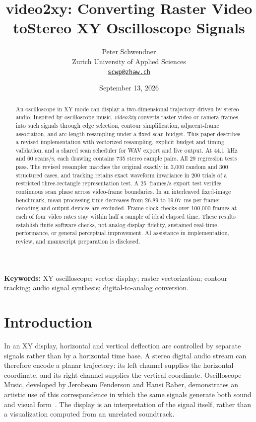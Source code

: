 \documentclass[11pt,a4paper]{article}
\title{\textbf{video2xy: Converting Raster Video to\newline Stereo XY Oscilloscope Signals}}
\author{Peter Schwendner\\[3pt]
\small Zurich University of Applied Sciences\\
\small\href{mailto:scwp@zhaw.ch}{\texttt{scwp@zhaw.ch}}}
\date{September 13, 2026}
\begin{document}
\maketitle
\begin{abstract}
An oscilloscope in XY mode can display a two-dimensional trajectory driven by stereo audio. Inspired by oscilloscope music, \emph{video2xy} converts raster video or camera frames into such signals through edge selection, contour simplification, adjacent-frame association, and arc-length resampling under a fixed scan budget. This paper describes a revised implementation with vectorized resampling, explicit budget and timing validation, and a shared scan scheduler for WAV export and live output. At 44.1~kHz and 60 scans/s, each drawing contains 735 stereo sample pairs. All 29 regression tests pass. The revised resampler matches the original exactly in 3,000 random and 300 structured cases, and tracking retains exact waveform invariance in 200 trials of a restricted three-rectangle representation test. A 25~frames/s export test verifies continuous scan phase across video-frame boundaries. In an interleaved fixed-image benchmark, mean processing time decreases from 26.89 to 19.07~ms per frame; decoding and output devices are excluded. Frame-clock checks over 100,000 frames at each of four video rates stay within half a sample of ideal elapsed time. These results establish finite software checks, not analog display fidelity, sustained real-time performance, or general perceptual improvement. AI assistance in implementation, review, and manuscript preparation is disclosed.

\end{abstract}
\noindent\textbf{Keywords:} XY oscilloscope; vector display; raster vectorization; contour tracking; audio signal synthesis; digital-to-analog conversion.

\section{Introduction}
In an XY display, horizontal and vertical deflection are controlled by separate signals rather than by a horizontal time base. A stereo digital audio stream can therefore encode a planar trajectory: its left channel supplies the horizontal coordinate, and its right channel supplies the vertical coordinate. Oscilloscope Music, developed by Jerobeam Fenderson and Hansi Raber, demonstrates an artistic use of this correspondence in which the same signals generate both sound and visual form~\cite{oscimusic}. The display is an interpretation of the signal itself, rather than a visualization computed from an unrelated soundtrack.
\end{document}
